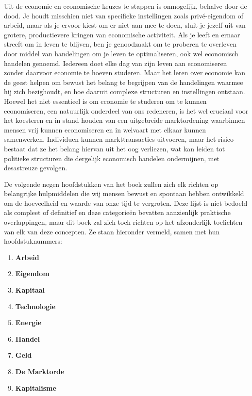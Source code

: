 \documentclass[
  a5paper,
  smalldemyvopaper,11pt,twoside,onecolumn,openright,extrafontsizes,
hidelinks]{memoir}
\providecommand{\tightlist}{%
  \setlength{\itemsep}{0pt}\setlength{\parskip}{0pt}}\usepackage{longtable,booktabs,array}
\begin{document}
Uit de economie en economische keuzes te stappen is onmogelijk, behalve
door de dood. Je houdt misschien niet van specifieke instellingen zoals
privé-eigendom of arbeid, maar als je ervoor kiest om er niet aan mee te
doen, sluit je jezelf uit van grotere, productievere kringen van
economische activiteit. Als je leeft en ernaar streeft om in leven te
blijven, ben je genoodzaakt om te proberen te overleven door middel van
handelingen om je leven te optimaliseren, ook wel economisch handelen
genoemd. Iedereen doet elke dag van zijn leven aan economiseren zonder
daarvoor economie te hoeven studeren. Maar het leren over economie kan
de geest helpen om bewust het belang te begrijpen van de handelingen
waarmee hij zich bezighoudt, en hoe daaruit complexe structuren en
instellingen ontstaan. Hoewel het niet essentieel is om economie te
studeren om te kunnen economiseren, een natuurlijk onderdeel van ons
redeneren, is het wel cruciaal voor het koesteren en in stand houden van
een uitgebreide marktordening waarbinnen mensen vrij kunnen economiseren
en in welvaart met elkaar kunnen samenwerken. Individuen kunnen
markttransacties uitvoeren, maar het risico bestaat dat ze het belang
hiervan uit het oog verliezen, wat kan leiden tot politieke structuren
die dergelijk economisch handelen ondermijnen, met desastreuze gevolgen.

De volgende negen hoofdstukken van het boek zullen zich elk richten op
belangrijke hulpmiddelen die wij mensen bewust en spontaan hebben
ontwikkeld om de hoeveelheid en waarde van onze tijd te vergroten. Deze
lijst is niet bedoeld als compleet of definitief en deze categorieën
bevatten aanzienlijk praktische overlappingen, maar dit boek zal zich
toch richten op het afzonderlijk toelichten van elk van deze concepten.
Ze staan hieronder vermeld, samen met hun hoofdstuknummers:

\begin{enumerate}
\def\labelenumi{\arabic{enumi}.}
\tightlist
\item
  \textbf{Arbeid}
\item
  \textbf{Eigendom}
\item
  \textbf{Kapitaal}
\item
  \textbf{Technologie}
\item
  \textbf{Energie}
\item
  \textbf{Handel}
\item
  \textbf{Geld}
\item
  \textbf{De Marktorde}
\item
  \textbf{Kapitalisme}
\end{enumerate}
\end{document}
